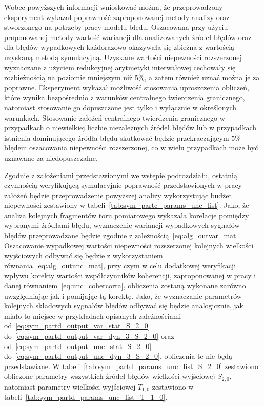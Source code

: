 Wobec powyższych informacji wnioskować można, że przeprowadzony eksperyment wykazał poprawność zaproponowanej metody analizy oraz stworzonego na potrzeby pracy modelu błędu. Oszacowana przy użyciu proponowanej metody wartość wariancji dla analizowanych źródeł błędów oraz dla błędów wypadkowych każdorazowo okazywała się zbieżna z wartością uzyskaną metodą symulacyjną. Uzyskane wartości niepewności rozszerzonej wyznaczane z użyciem redukcyjnej arytmetyki interwałowej cechowały się rozbieżnością na poziomie mniejszym niż $5\%$, a zatem również uznać można je za poprawne. Eksperyment wykazał możliwość stosowania uproszczenia obliczeń, które wynika bezpośrednio z warunków centralnego twierdzenia granicznego, natomiast stosowanie go dopuszczone jest tylko i wyłącznie w określonych warunkach. Stosowanie założeń centralnego twierdzenia granicznego w przypadkach o niewielkiej liczbie niezależnych źródeł błędów lub w przypadkach istnienia dominującego źródła błędu skutkować będzie przekraczającym $5\%$ błędem oszacowania niepewności rozszerzonej, co w wielu przypadkach może być uznawane za niedopuszczalne.

Zgodnie z założeniami przedstawionymi we wstępie podrozdziału, ostatnią czynnością weryfikującą symulacyjnie poprawność przedstawionych w pracy założeń będzie przeprowadzenie powyższej analizy wykorzystując budżet niepewności zestawiony w tabeli~\ref{tab:sym_partc_params_unc_list}. Jako, że analiza kolejnych fragmentów toru pomiarowego wykazała korelacje pomiędzy wybranymi źródłami błędu, wyznaczenie wariancji wypadkowych sygnałów błędów przeprowadzane będzie zgodnie z zależnością~\eqref{eq:alg_outvar_mat}. Oszacowanie wypadkowej wartości niepewności rozszerzonej kolejnych wielkości wyjściowych odbywać się będzie z wykorzystaniem równania~\eqref{eq:alg_outunc_mat}, przy czym w celu dodatkowej weryfikacji wpływu korekty wartości współczynników koherencji, zaproponowanej w pracy i danej równaniem~\eqref{eq:unc_cohercorra}, obliczenia zostaną wykonane zarówno uwzględniając jak i pomijając tą korektę. Jako, że wyznaczanie parametrów kolejnych składowych sygnałów błędów odbywać się będzie analogicznie, jak miało to miejsce w przykładach opisanych zależnościami od~\eqref{eq:sym_partd_output_var_stat_S_2_0} do~\eqref{eq:sym_partd_output_var_dyn_3_S_2_0} oraz od~\eqref{eq:sym_partd_output_unc_stat_S_2_0} do~\eqref{eq:sym_partd_output_unc_dyn_3_S_2_0}, obliczenia te nie będą przedstawiane. W tabeli~\ref{tab:sym_partd_params_unc_list_S_2_0} zestawiono obliczone parametry wszystkich źródeł błędów wielkości wyjściowej $S_{2,0}$, natomiast parametry wielkości wyjściowej $T_{1,0}$ zestawiono w tabeli~\ref{tab:sym_partd_params_unc_list_T_1_0}.

